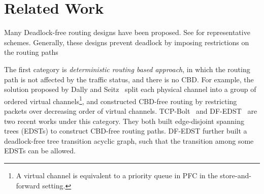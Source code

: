 \section{Related Work}\label{sec:related}

 Many Deadlock-free routing designs have been
proposed. See
\cite{dally,duato93,dally93,sancho2004,flich2012survey,lash,dag,wu2003fault,glass,duato2001,domke2011,puente1999,dfedst16}
for representative schemes. Generally, these designs prevent deadlock by
imposing restrictions on the routing paths 

The first category is {\em deterministic routing based approach}, in which the
routing path is not affected by the traffic status, and there is no CBD. For example, the solution proposed by Dally and Seitz~\cite{dally} split each physical channel  into a group of ordered virtual channels\footnote{A virtual channel is equivalent to a priority queue in PFC in the store-and-forward setting.}, and constructed CBD-free routing by restricting packets over decreasing order of virtual channels.
TCP-Bolt~\cite{tcpbolt} and DF-EDST~\cite{dfedst16} are two recent works under this category. They both built edge-disjoint spanning trees (EDSTs) to construct CBD-free routing paths. DF-EDST further built a deadlock-free tree transition acyclic graph, such that the transition among some EDSTs can be allowed. 



